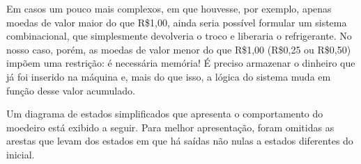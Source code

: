 \documentclass[a4paper,12pt]{article}
\begin{document}
\noindent Em casos um pouco mais complexos, em que houvesse, por exemplo, apenas moedas de valor maior do que R\$1,00, ainda seria possível formular um sistema combinacional, que simplesmente devolveria o troco e liberaria o refrigerante. No nosso caso, porém, as moedas de valor menor do que R\$1,00 (R\$0,25 ou R\$0,50) impõem uma restrição: é necessária memória! É preciso armazenar o dinheiro que já foi inserido na máquina e, mais do que isso, a lógica do sistema muda em função desse valor acumulado.

Um diagrama de estados simplificados que apresenta o comportamento do moedeiro está exibido a seguir. Para melhor apresentação, foram omitidas as arestas que levam dos estados em que há saídas não nulas a estados diferentes do inicial.

\begin{figure}[H]
    \centering
    \vspace{-25pt}
\end{figure}
\end{document}
